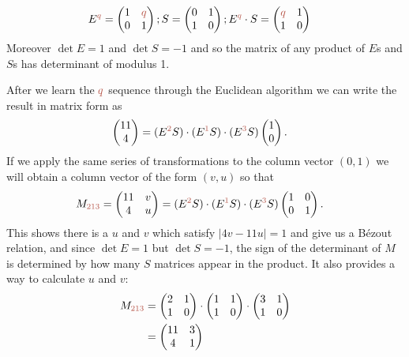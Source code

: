 \begin{align*}
	E^{\jq} &=  \begin{pmatrix} 1 & \jq \\ 0 & 1\end{pmatrix}
	;
	S =  \begin{pmatrix} 0 & 1  \\ 1 & 0  \end{pmatrix}
	;
	E^{\jq} \cdot S = \begin{pmatrix}\jq & 1  \\ 1 & 0  \end{pmatrix}
\end{align*}
Moreover  $\det E=1$ and $\det S=-1$ and so the matrix of any product of $E$s and $S$s has determinant of modulus 1. 

After we learn the $\jq$ sequence through the Euclidean algorithm we can write the result in matrix form as 
\begin{align*}
	\begin{pmatrix} 11 \\ 4 \end{pmatrix}  &= 
	(E^{\jqn{2}} S )\cdot( E^{\jqn{1}} S ) \cdot (E^{\jqn{3}} S)  \begin{pmatrix} 1 \\ 0 \end{pmatrix}.
\end{align*}
If we apply the same series of transformations to the column vector $(0,1)$ we will obtain a column vector of the form $(v,u)$  so that
\begin{align}
		M_{\jqn{2}\jqn{1}\jqn{3}}= \begin{pmatrix} 11 & v \\ 4 & u \end{pmatrix}   &= 
	(E^{\jqn{2}} S )\cdot( E^{\jqn{1}} S ) \cdot (E^{\jqn{3}} S) 
	 \begin{pmatrix} 1&0  \\ 0&1 \end{pmatrix} 
	 \label{eq:M213}.
\end{align}
This shows there is a  $u$ and $v$ which satisfy $|4 v-11 u|=1$ and give us a B\'ezout relation, and since $\det E=1$ but $\det S=-1$, the sign of the determinant of $M$ is determined by how many $S$ matrices appear in the product. It also provides a way to calculate $u$ and $v$:
\begin{align*}
	M_{\jqn{2}\jqn{1}\jqn{3}}&=
	 \begin{pmatrix} 2 & 1 \\ 1 & 0 \end{pmatrix}\cdot
 \begin{pmatrix} 1 & 1 \\ 1 & 0 \end{pmatrix}\cdot
	  \begin{pmatrix} 3 & 1 \\ 1 & 0 \end{pmatrix}
	 	 \\
	 &= \begin{pmatrix} 11 & 3 \\ 4 & 1 \end{pmatrix}
\end{align*}
